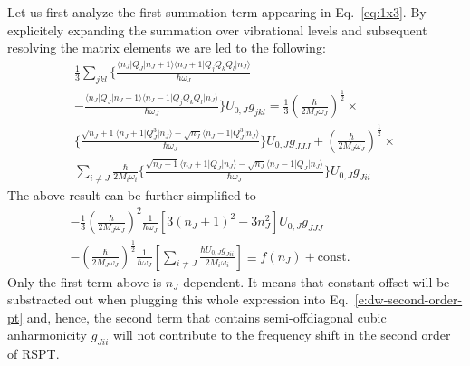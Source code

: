 \documentclass[a4paper,titlepage,twoside,fleqn,12pt]{book}
\begin{document}
\begin{refsection}
Let us first analyze the first summation term appearing in Eq.~\eqref{eq:1x3}.
By explicitely expanding the summation over vibrational levels and subsequent resolving
the matrix elements we are led to the following:
%
\begin{multline}
\frac{1}{3}  \sum_{jkl}
  \Bigg\{ 
   \frac{\langle n_J \vert Q_J \vert n_J+1 \rangle 
         \langle n_J+1 \vert Q_jQ_kQ_l \vert n_J \rangle}{\hbar \omega_J} \\
 - \frac{\langle n_J \vert Q_J \vert n_J-1 \rangle
         \langle n_J-1 \vert Q_jQ_kQ_l \vert n_J \rangle}{\hbar \omega_J}
  \Bigg\}     U_{0,J} g_{jkl} 
= 
\frac{1}{3} \left( \frac{\hbar}{2M_J\omega_J} \right)^\frac{1}{2} \times \\
  \Bigg\{
    \frac{\sqrt{n_J+1}\langle n_J+1 \vert Q_J^3 \vert n_J \rangle - \sqrt{n_J} 
         \langle n_J-1 \vert Q_J^3 \vert n_J \rangle}{\hbar\omega_J} 
  \Bigg\} U_{0,J} g_{JJJ} + \left( \frac{\hbar}{2M_J\omega_J} \right)^\frac{1}{2} \times \\
\sum_{i\ne J} \frac{\hbar}{2M_i\omega_i}
  \Bigg\{
     \frac{\sqrt{n_J+1}\langle n_J+1 \vert Q_J \vert n_J \rangle - \sqrt{n_J}
          \langle n_J-1 \vert Q_J \vert n_J \rangle}{\hbar\omega_J}
  \Bigg\} U_{0,J} g_{Jii}
\end{multline}
%
The above result can be further simplified to
%
\begin{multline}    \label{e:x552}
-\frac{1}{3} \left( \frac{\hbar}{2M_J\omega_J} \right)^2 \frac{1}{\hbar\omega_J} 
           \left[ 3\left( n_J+1 \right)^2 - 3n_J^2 \right] U_{0,J} g_{JJJ} \\ - 
     \left( \frac{\hbar}{2M_J\omega_J} \right)^\frac{1}{2} \frac{1}{\hbar\omega_J}
     \left[ \sum_{i\ne J} \frac{\hbar U_{0,J} g_{Jii}}{2M_i\omega_i} \right]  \equiv 
f(n_J) + \mathrm{const.} \qquad \qquad
\end{multline}
%
Only the first term above is $n_J$-dependent. It means that constant offset will be 
substracted out when plugging this whole expression into Eq.~\eqref{e:dw-second-order-pt}
and, hence, the second term that contains semi\hyp{}offdiagonal cubic anharmonicity $g_{Jii}$ 
will not contribute to the frequency shift in the second order of RSPT.


\end{refsection}
\end{document}
